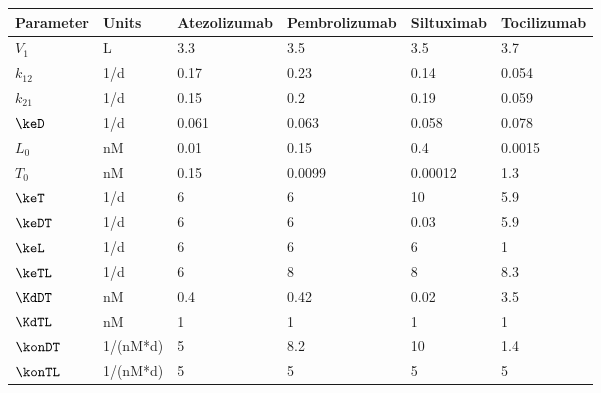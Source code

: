 \begin{tabular}{llllll}
  \hline
Parameter & Units & Atezolizumab & Pembrolizumab & Siltuximab & Tocilizumab \\ 
  \hline
$V_1$ & L & 3.3 & 3.5 & 3.5 & 3.7 \\ 
  $k_{12}$ & 1/d & 0.17 & 0.23 & 0.14 & 0.054 \\ 
  $k_{21}$ & 1/d & 0.15 & 0.2 & 0.19 & 0.059 \\ 
  $\keD$ & 1/d & 0.061 & 0.063 & 0.058 & 0.078 \\ 
  $L_0$ & nM & 0.01 & 0.15 & 0.4 & 0.0015 \\ 
  $T_0$ & nM & 0.15 & 0.0099 & 0.00012 & 1.3 \\ 
  $\keT$ & 1/d & 6 & 6 & 10 & 5.9 \\ 
  $\keDT$ & 1/d & 6 & 6 & 0.03 & 5.9 \\ 
  $\keL$ & 1/d & 6 & 6 & 6 & 1 \\ 
  $\keTL$ & 1/d & 6 & 8 & 8 & 8.3 \\ 
  $\KdDT$ & nM & 0.4 & 0.42 & 0.02 & 3.5 \\ 
  $\KdTL$ & nM & 1 & 1 & 1 & 1 \\ 
  $\konDT$ & 1/(nM*d) & 5 & 8.2 & 10 & 1.4 \\ 
  $\konTL$ & 1/(nM*d) & 5 & 5 & 5 & 5 \\ 
   \hline
\end{tabular}
